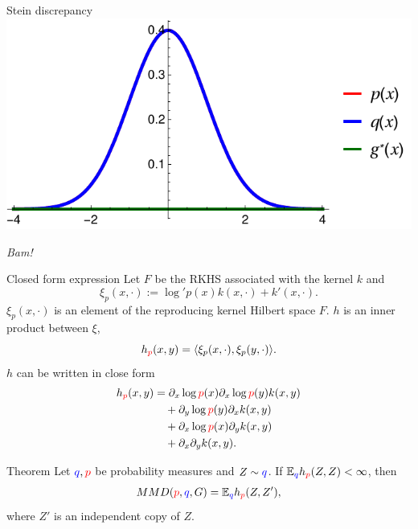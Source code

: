 \begin{frame}
\begin{columns}
\begin{column}{.33\linewidth}
\begin{block}{Stein discrepancy}
\includegraphics[scale=1.2]{../../presentation/img/s0.pdf}
\vspace{1cm}
\begin{center}
\emph{Bam!}
\end{center}
\end{block}



\vspace{-0.75cm}
\begin{block}{Closed form expression}
 Let $F$ be the RKHS associated with the kernel $k$ and 
\large
 \begin{equation*}
\xi_{p}(x,\cdot):=\log' p(x) k(x,\cdot)+  k'(x,\cdot).
\end{equation*}
 $\xi_{p}(x,\cdot)$ is an element of the reproducing kernel Hilbert
space $F$.  $h$ is an  inner product between $\xi$, 
\[
h_{{\color{red} p}}(x,y)   = \langle\xi_{p}(x,\cdot),\xi_{p}(y,\cdot)\rangle. 
\]
$h$ can be written in close form
\large
\begin{align*}
h_{{\color{red} p}}(x,y) & = \partial_{x} \log {\color{red} p}(x) \partial_{x} \log {\color{red} p}(y) k(x,y)\\
 & \quad+\partial_{y} \log {\color{red} p}(y) \partial_{x}  k(x,y)\\
 & \quad+\partial_{x} \log {\color{red} p}(x) \partial_{y}k(x,y)\\
 & \quad+\partial_{x} \partial_{y} k(x,y).
\end{align*}
\end{block}

\vspace{-0.75cm}

\begin{block}{Theorem}
\large
Let ${ \color{blue} q},{\color{red} p}$ be probability measures and $Z\sim { \color{blue} q}$. 
If $\mathbb{E}_{{ \color{blue} q}} h_{{\color{red} p}}(Z,Z)<\infty$, then 
$$MMD({\color{red} p},{ \color{blue} q},G) = \mathbb{E}_{{ \color{blue} q}} h_{{\color{red} p}}(Z,Z'),$$
where $Z'$ is an independent copy of $Z$.
\end{block}



\end{column}
\end{columns}
\end{frame}
